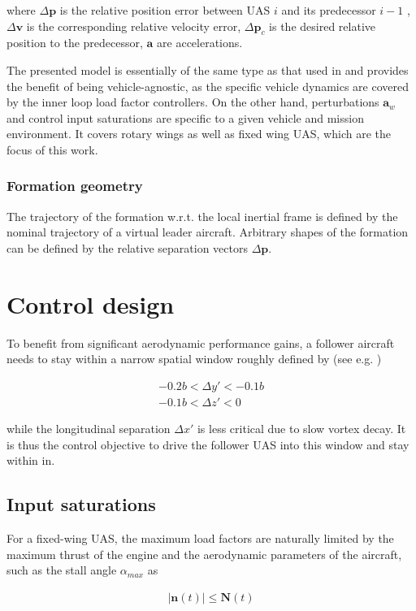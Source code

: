 \documentclass{ifacconf}
\providecommand{\mbf}[1]{\mathbf{#1}}
\newcommand{\idxFollower}{{\ensuremath{i} }}
\newcommand{\idxPredecessor}{{\ensuremath{i-1} }}
\begin{document}
where $\Delta \mbf{p}$ is the relative position error between UAS \idxFollower and its predecessor \idxPredecessor, $\Delta \mbf{v}$ is the corresponding relative velocity error, $\Delta \mbf{p}_c$ is the desired relative position to the predecessor, $\mbf{a}$ are accelerations.

The presented model is essentially of the same type as that used in  \cite{galzi2006uav} and provides the benefit of being vehicle-agnostic, as the specific vehicle dynamics are covered by the inner loop load factor controllers. On the other hand, perturbations $\mbf{a}_w$ and control input saturations are specific to a given vehicle and mission environment. It covers rotary wings as well as fixed wing UAS, which are the focus of this work.

\subsubsection{Formation geometry}
The trajectory of the formation w.r.t. the local inertial frame is defined by the nominal trajectory of a virtual leader aircraft. Arbitrary shapes of the formation can be defined by the relative separation vectors $\Delta \mbf{p}$. 

\section{Control design}
To benefit from significant aerodynamic performance gains, a follower aircraft needs to stay within a narrow spatial window roughly defined by (see e.g. \cite{jake2003f})

\begin{align}
-0.2 b < \Delta y' < -0.1 b \\
-0.1 b < \Delta z' < 0 
\label{eq:windowz}
\end{align}

while the longitudinal separation $\Delta x'$ is less critical due to slow vortex decay.
It is thus the control objective to drive the follower UAS into this window and stay within in.

\subsection{Input saturations}
For a fixed-wing UAS, the maximum load factors are naturally limited by the maximum thrust of the engine and the aerodynamic parameters of the aircraft, such as the stall angle $\alpha_{max}$ as

\begin{align}
|\mbf{n}(t)| \leq \mbf{N}(t)
\label{eq:loadfactorsaturations}
\end{align}
\end{document}
